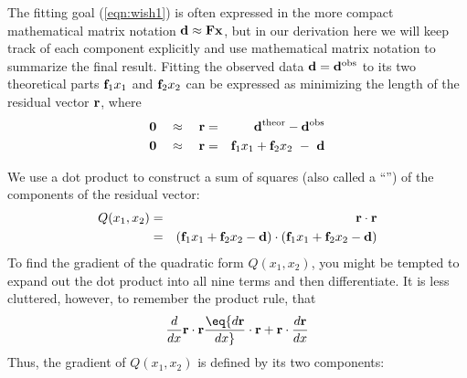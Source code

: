 \par
The fitting goal (\ref{eqn:wish1}) is often expressed in the more compact
mathematical matrix notation ${\bf d}  \approx \bold F   \bold x $,
but in our derivation here
we will keep track of each component explicitly
and use mathematical matrix notation to summarize the final result.
Fitting the observed data $\bold d = \bold d^{\rm obs}$
to its two theoretical parts
          $\bold f_1x_1$ and $\bold f_2x_2$
can be expressed
as minimizing the length of the residual vector $\bold r$, where
\begin{eqnarray}
        \bold 0 \quad\approx\quad
        \bold r &=&  \bold d^{\rm theor} -  \bold d^{\rm obs}
        \\
        \bold 0 \quad\approx\quad
        \bold r &=&  \bold f_1 x_1 + \bold f_2 x_2  \ -\ {\bf d}
        \label{eqn:resdef}
\end{eqnarray}

We use a dot product to construct a sum of squares (also called a ``'')
of the components of the residual vector:
\begin{eqnarray}
Q(x_1,x_2) &=& \bold r \cdot \bold r \\
           &=&
                   ({\bf f}_1 x_1 + {\bf f}_2 x_2 - {\bf d} )
           \cdot
                   ({\bf f}_1 x_1 + {\bf f}_2 x_2 - {\bf d} )
\end{eqnarray}
To find the gradient of the quadratic form $Q(x_1,x_2)$,
you might be tempted to expand out the dot product into all nine terms
and then differentiate.
It is less cluttered, however, to remember the product rule, that
\begin{equation}
{d\over dx} \bold r \cdot \bold r
\eq
{d\bold r \over dx} \cdot \bold r
+
\bold r
\cdot
{d\bold r \over dx}
\end{equation}
Thus, the gradient of $ Q(x_1,x_2)$  is defined by its two components:

